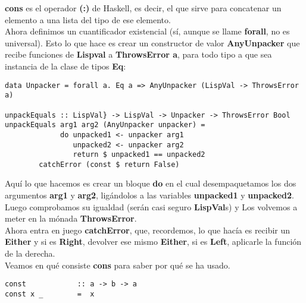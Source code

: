 \textbf{cons} es el operador \textbf{(:)} de Haskell, es decir, el que sirve para concatenar un elemento a una lista del tipo de ese elemento.\\

Ahora definimos un cuantificador existencial (s\'i, aunque se llame \textbf{forall}, no es universal). Esto lo que hace es crear un constructor de valor \textbf{AnyUnpacker} que recibe funciones de \textbf{Lispval} a \textbf{ThrowsError a}, para todo tipo a que sea instancia de la clase de tipos \textbf{Eq}:\\

\begin{minipage}{\linewidth}
\begin{small}
\begin{lstlisting}[frame=single]
data Unpacker = forall a. Eq a => AnyUnpacker (LispVal -> ThrowsError a)

unpackEquals :: LispVal} -> LispVal -> Unpacker -> ThrowsError Bool
unpackEquals arg1 arg2 (AnyUnpacker unpacker) = 
             do unpacked1 <- unpacker arg1
                unpacked2 <- unpacker arg2
                return $ unpacked1 == unpacked2
        catchError (const $ return False)
\end{lstlisting}
\end{small}
\end{minipage}

Aqu\'i lo que hacemos es crear un bloque \textbf{do} en el cual desempaquetamos los dos argumentos \textbf{arg1} y \textbf{arg2}, lig\'andolos a las variables \textbf{unpacked1} y \textbf{unpacked2}. Luego comprobamos su igualdad (ser\'an casi seguro \textbf{LispVal}s) y Los volvemos a meter en la m\'onada \textbf{ThrowsError}.\\

Ahora entra en juego \textbf{catchError}, que, recordemos, lo que hac\'ia es recibir un \textbf{Either} y si es \textbf{Right}, devolver ese mismo \textbf{Either}, si es \textbf{Left}, aplicarle la funci\'on de la derecha.\\

Veamos en qu\'e consiste \textbf{cons} para saber por qu\'e se ha usado.\\

\begin{minipage}{\linewidth}
\begin{small}
\begin{lstlisting}[frame=single]
const            :: a -> b -> a
const x _        =  x
\end{lstlisting}
\end{small}
\end{minipage}


